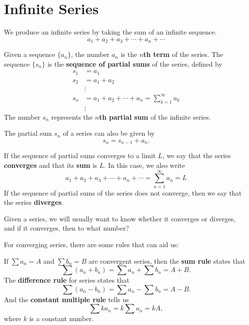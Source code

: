 \chapter{Infinite Series}
\label{ch:series}

We produce an infinite series by taking the sum of an infinite sequence.
\[ a_1 + a_2 + a_3 + \cdots + a_n + \cdots \]

Given a sequence $\{a_n\}$, the number $a_n$ is the \textbf{$n$th term} of the series.
The sequence $\{s_n\}$ is the \textbf{sequence of partial sums} of the series, defined by
\cite[p.~544]{thomas}
\begin{align*}
  s_1 &= a_1 \\
  s_2 &= a_1 + a_2 \\
  & \vdots \\
  s_n &= a_1 + a_2 + \cdots + a_n = \sum^\infty_{k=1} a_k \\
  & \vdots
\end{align*}
The number $s_n$ represents the \textbf{$n$th partial sum} of the infinite
series.

The partial sum \(s_n\) of a series can also be given by
  \[ s_n = s_{n-1} + a_n .\]

If the sequence of partial sums converges to a limit $L$, we say that
the series \textbf{converges} and that its \textbf{sum} is $L$. In this case, we
also write
\[ a_1 + a_2 + a_3 + \cdots + a_n + \cdots = \sum_{n=1}^\infty a_n = L \]
If the sequence of partial sums of the series does not converge, then we say
that the series \textbf{diverges}.
\cite[p.~544]{thomas}

Given a series, we will usually want to know whether it converges or diverges,
and if it converges, then to what number?

For converging series, there are some rules that can aid us:
\begin{theorem}\label{th:combiningseries}
  If $\sum a_n = A$ and $\sum b_n = B$ are convergent series, then
  the \textbf{sum rule} states that
  \[ \sum (a_n+b_n) = \sum a_n + \sum b_n = A +B.\]
  The \textbf{difference rule} for series states that
  \[ \sum (a_n-b_n) = \sum a_n - \sum b_n = A -B. \]
  And the \textbf{constant multiple rule} tells us
  \[ \sum ka_n = k\sum a_n = kA, \]
  where $k$ is a constant number.
\end{theorem}
\cite[p.~549]{thomas}


